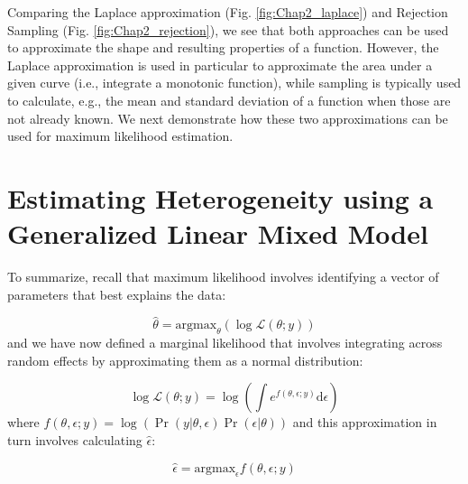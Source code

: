 Comparing the Laplace approximation (Fig. \ref{fig:Chap2_laplace}) and Rejection Sampling (Fig. \ref{fig:Chap2_rejection}), we see that both approaches can be used to approximate the shape and resulting properties of a function.  However, the Laplace approximation is used in particular to approximate the area under a given curve (i.e., integrate a monotonic function), while sampling is typically used to calculate, e.g., the mean and standard deviation of a function when those are not already known.  We next demonstrate how these two approximations can be used for maximum likelihood estimation.  

\section{Estimating Heterogeneity using a Generalized Linear Mixed Model} \label{sec:Chap2_GLMM}

To summarize, recall that maximum likelihood involves identifying a vector of parameters that best explains the data:

\begin{equation}
    \hat{\theta} = \mathrm{argmax}_{\theta}( \log \mathcal{L}(\theta;y) )
\end{equation}
and we have now defined a marginal likelihood that involves integrating across random effects by approximating them as a normal distribution:

\begin{equation}
    \log \mathcal{L}(\theta;y) = \log \left( \int e^{f(\theta,\epsilon;y)} \mathrm{d}\epsilon \right)
\end{equation}
where \( f(\theta,\epsilon;y) = \log\left(\Pr(y|\theta,\epsilon) \Pr(\epsilon | \theta)\right) \) and this approximation in turn involves calculating \( \hat{\epsilon} \):

\begin{equation}
    \hat{\epsilon} = \mathrm{argmax}_{\epsilon} f(\theta,\epsilon;y) 
\end{equation}

